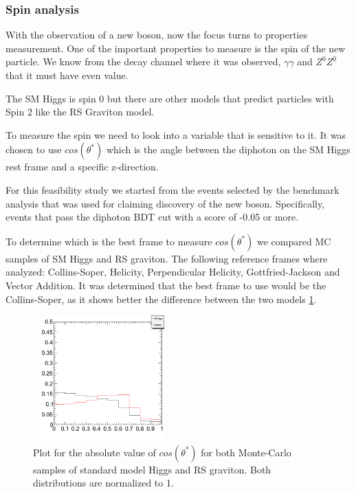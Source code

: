 \documentclass[%
reprint,
amsmath,
amssymb,
aps,
pra,
showkeys
]{revtex4-1}
\begin{document}
\subsubsection{Spin analysis}

With the observation of a new boson, now the focus turns to properties measurement. One of the important properties
to measure is the spin of the new particle. We know from the decay channel where it was observed, $\gamma\gamma$ 
and $Z^0Z^0$ that it must have even value.

The SM Higgs is spin 0 but there are other models that predict particles with Spin 2 like the RS Graviton model.

To measure the spin we need to look into a variable that is sensitive to it. It was chosen to use $cos(\theta^{*})$ 
which is the angle between the diphoton on the SM Higgs rest frame and a specific z-direction.

For this feasibility study we started from the events selected by the benchmark analysis that was used for claiming 
discovery of the new boson. Specifically, events that pass the diphoton BDT cut with a score of -0.05 or more.

To determine which is the best frame to measure $cos(\theta^{*})$ we compared MC samples of SM Higgs and RS graviton. 
The following reference frames where analyzed: Collins-Soper, Helicity, Perpendicular Helicity, Gottfried-Jackson and 
Vector Addition. It was determined that the best frame to use would be the Collins-Soper, as it shows better the 
difference between the two models \ref{figure_SpinAnalysis_CosThetaStar}.

\begin{figure}[ht]
\centering
\includegraphics[width=0.45\textwidth]{img/cosThetaStar_cs_all_Norm1_SignalCompare.png}
\caption{Plot for the absolute value of $cos(\theta^{*})$ for both Monte-Carlo samples of standard model Higgs and RS graviton. 
Both distributions are normalized to 1.}
\label{figure_SpinAnalysis_CosThetaStar}
\end{figure}
\end{document}
